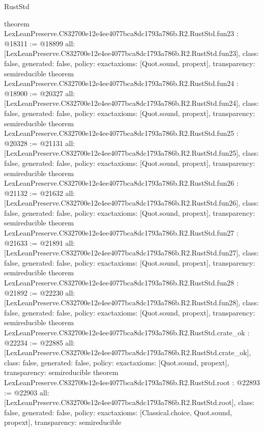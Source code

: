 \begin{lexlean}{RustStd}
\begin{coremodule}
{}
theorem LexLeanPreserve.C832700e12e4ee4077bca8dc1793a786b.R2.RustStd.fun23 : @18311 := @18899 {
  all: [LexLeanPreserve.C832700e12e4ee4077bca8dc1793a786b.R2.RustStd.fun23],
  class: false,
  generated: false,
  policy: exact{axioms: [Quot.sound, propext]},
  transparency: semireducible
}
theorem LexLeanPreserve.C832700e12e4ee4077bca8dc1793a786b.R2.RustStd.fun24 : @18900 := @20327 {
  all: [LexLeanPreserve.C832700e12e4ee4077bca8dc1793a786b.R2.RustStd.fun24],
  class: false,
  generated: false,
  policy: exact{axioms: [Quot.sound, propext]},
  transparency: semireducible
}
theorem LexLeanPreserve.C832700e12e4ee4077bca8dc1793a786b.R2.RustStd.fun25 : @20328 := @21131 {
  all: [LexLeanPreserve.C832700e12e4ee4077bca8dc1793a786b.R2.RustStd.fun25],
  class: false,
  generated: false,
  policy: exact{axioms: [Quot.sound, propext]},
  transparency: semireducible
}
theorem LexLeanPreserve.C832700e12e4ee4077bca8dc1793a786b.R2.RustStd.fun26 : @21132 := @21632 {
  all: [LexLeanPreserve.C832700e12e4ee4077bca8dc1793a786b.R2.RustStd.fun26],
  class: false,
  generated: false,
  policy: exact{axioms: [Quot.sound, propext]},
  transparency: semireducible
}
theorem LexLeanPreserve.C832700e12e4ee4077bca8dc1793a786b.R2.RustStd.fun27 : @21633 := @21891 {
  all: [LexLeanPreserve.C832700e12e4ee4077bca8dc1793a786b.R2.RustStd.fun27],
  class: false,
  generated: false,
  policy: exact{axioms: [Quot.sound, propext]},
  transparency: semireducible
}
theorem LexLeanPreserve.C832700e12e4ee4077bca8dc1793a786b.R2.RustStd.fun28 : @21892 := @22230 {
  all: [LexLeanPreserve.C832700e12e4ee4077bca8dc1793a786b.R2.RustStd.fun28],
  class: false,
  generated: false,
  policy: exact{axioms: [Quot.sound, propext]},
  transparency: semireducible
}
theorem LexLeanPreserve.C832700e12e4ee4077bca8dc1793a786b.R2.RustStd.crate_ok : @22234 := @22885 {
  all: [LexLeanPreserve.C832700e12e4ee4077bca8dc1793a786b.R2.RustStd.crate_ok],
  class: false,
  generated: false,
  policy: exact{axioms: [Quot.sound, propext]},
  transparency: semireducible
}
theorem LexLeanPreserve.C832700e12e4ee4077bca8dc1793a786b.R2.RustStd.root : @22893 := @22903 {
  all: [LexLeanPreserve.C832700e12e4ee4077bca8dc1793a786b.R2.RustStd.root],
  class: false,
  generated: false,
  policy: exact{axioms: [Classical.choice, Quot.sound, propext]},
  transparency: semireducible
}


\end{coremodule}
\end{lexlean}
